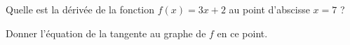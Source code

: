 
\begin{exercice}\label{exosmath-0387}

    Quelle est la dérivée de la fonction \( f(x)=3x+2\) au point d'abscisse \( x=7\) ?

    Donner l'équation de la tangente au graphe de \( f\) en ce point.

\end{exercice}
